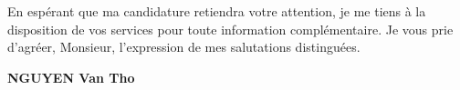 \documentclass[11pt]{report}
\begin{document}
En espérant que ma candidature retiendra votre attention, je me tiens à la disposition de 
vos services pour toute information complémentaire. Je vous prie d'agréer,
Monsieur, l'expression de mes salutations distinguées.\\[2em]

\begin{flushright}
{\bfseries NGUYEN Van Tho}\\
\end{flushright}
 
\end{document}
